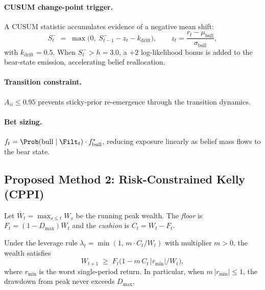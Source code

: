 \paragraph{CUSUM change-point trigger.}
A CUSUM statistic accumulates evidence of a negative mean shift:
\begin{equation}
    S_t^- \;=\; \max\!\bigl(0,\;
    S_{t-1}^- - z_t - k_{\mathrm{drift}}\bigr),
    \qquad
    z_t = \frac{r_t - \mu_{\text{bull}}}{\sigma_{\text{bull}}},
    \label{eq:cusum}
\end{equation}
with $k_{\mathrm{drift}}=0.5$.  When $S_t^- > h=3.0$, a $+2$ log-likelihood
bonus is added to the bear-state emission, accelerating belief reallocation.

\paragraph{Transition constraint.}
$A_{ii} \leq 0.95$ prevents sticky-prior re-emergence through the transition
dynamics.

\paragraph{Bet sizing.}
$f_t = \Prob(\text{bull}\mid\Filt_t)\cdot f^*_{\text{bull}}$, reducing
exposure linearly as belief mass flows to the bear state.

\subsection{Proposed Method 2: Risk-Constrained Kelly (CPPI)}
\label{sec:cppi}

\begin{definition}
\label{def:cppi}
Let $\bar W_t = \max_{s\leq t}W_s$ be the running peak wealth.  The
\emph{floor} is $F_t = (1-D_{\max})\bar W_t$ and the
\emph{cushion} is $C_t = W_t - F_t$.
\end{definition}

\begin{proposition}
\label{prop:cppi_bound}
Under the leverage rule $\lambda_t = \min(1,\, m\cdot C_t / W_t)$ with
multiplier $m > 0$, the wealth satisfies
\begin{equation}
    W_{t+1} \;\geq\; F_t\bigl(1 - m\,C_t\,|r_{\min}|/W_t\bigr),
    \label{eq:cppi_bound}
\end{equation}
where $r_{\min}$ is the worst single-period return.  In particular, when
$m\,|r_{\min}| \leq 1$, the drawdown from peak never exceeds $D_{\max}$.
\end{proposition}

